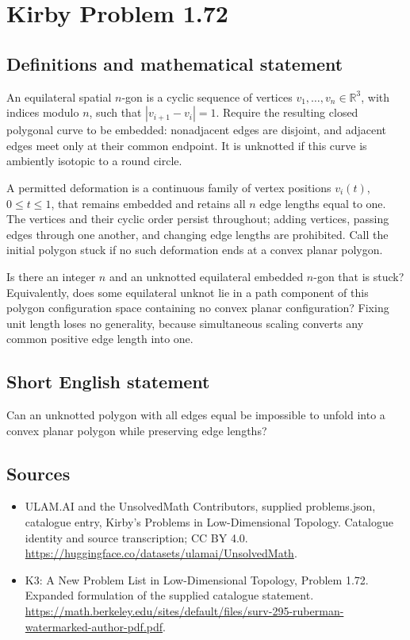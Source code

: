 \documentclass[11pt,a4paper]{article}
\begin{document}
\section*{Kirby Problem 1.72}\label{statement}

\subsection{Definitions and mathematical statement}
An equilateral spatial $n$-gon is a cyclic sequence of vertices
$v_1,\ldots,v_n\in\mathbb R^3$, with indices modulo $n$, such that
$|v_{i+1}-v_i|=1$. Require the resulting closed polygonal curve to be embedded:
nonadjacent edges are disjoint, and adjacent edges meet only at their common
endpoint. It is unknotted if this curve is ambiently isotopic to a round circle.

A permitted deformation is a continuous family of vertex positions $v_i(t)$,
$0\leq t\leq1$, that remains embedded and retains all $n$ edge lengths equal to
one. The vertices and their cyclic order persist throughout; adding vertices,
passing edges through one another, and changing edge lengths are prohibited.
Call the initial polygon stuck if no such deformation ends at a convex planar
polygon.

Is there an integer $n$ and an unknotted equilateral embedded $n$-gon that is
stuck? Equivalently, does some equilateral unknot lie in a path component of this
polygon configuration space containing no convex planar configuration? Fixing
unit length loses no generality, because simultaneous scaling converts any
common positive edge length into one.
\subsection{Short English statement}
Can an unknotted polygon with all edges equal be impossible to unfold into a convex planar polygon while preserving edge lengths?
\subsection{Sources}
\begin{itemize}
\item[S1] ULAM.AI and the UnsolvedMath Contributors, supplied problems.json, catalogue entry, Kirby's Problems in Low-Dimensional Topology. Catalogue identity and source transcription; CC BY 4.0.
\url{https://huggingface.co/datasets/ulamai/UnsolvedMath}.
\item[S2] K3: A New Problem List in Low-Dimensional Topology, Problem 1.72. Expanded formulation of the supplied catalogue statement.
\url{https://math.berkeley.edu/sites/default/files/surv-295-ruberman-watermarked-author-pdf.pdf}.
\end{itemize}
\end{document}
